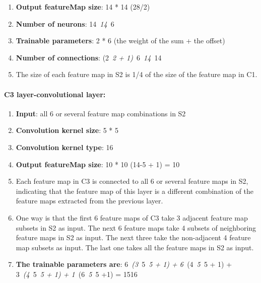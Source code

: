 \documentclass[10pt]{article} %
\begin{document}
\begin{spacing}{1.5}
\begin{enumerate}
\item  \textbf{Output featureMap size}: 14 * 14 (28/2)

\item  \textbf{Number of neurons}: 14~\textit{14~}6

\item  \textbf{Trainable parameters}: 2 * 6 (the weight of the sum + the offset)

\item  \textbf{Number of connections}: (2~\textit{2 + 1)~}6~\textit{14~}14

\item  The size of each feature map in S2 is 1/4 of the size of the feature map in C1.
\end{enumerate}

\noindent 
\paragraph{C3 layer-convolutional layer:}

\begin{enumerate}
\item \textbf{ Input}: all 6 or several feature map combinations in S2

\item  \textbf{Convolution kernel size}: 5 * 5

\item  \textbf{Convolution kernel type}: 16

\item  \textbf{Output featureMap size}: 10 * 10 (14-5 + 1) = 10

\item  Each feature map in C3 is connected to all 6 or several feature maps in S2, indicating that the feature map of this layer is a different combination of the feature maps extracted from the previous layer.

\item  One way is that the first 6 feature maps of C3 take 3 adjacent feature map subsets in S2 as input. The next 6 feature maps take 4 subsets of neighboring feature maps in S2 as input. The next three take the non-adjacent 4 feature map subsets as input. The last one takes all the feature maps in S2 as input.

\item  \textbf{The trainable parameters are}: 6~\textit{(3~}5~\textit{5 + 1) + 6~}(4~\textit{5~}5 + 1) + 3~\textit{(4~}5~\textit{5 + 1) + 1~}(6~\textit{5~}5 +1) = 1516


\end{enumerate}
\end{spacing}
\end{document}
